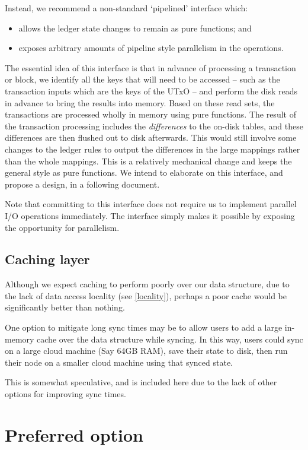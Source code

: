 \documentclass[11pt,a4paper]{article}
\begin{document}
Instead, we recommend a non-standard `pipelined' interface which:
\begin{itemize}
\item allows the ledger state changes to remain as pure functions; and
\item exposes arbitrary amounts of pipeline style parallelism in the operations.
\end{itemize}
The essential idea of this interface is that in advance of processing a
transaction or block, we identify all the keys that will need to be accessed --
such as the transaction inputs which are the keys of the UTxO -- and perform
the disk reads in advance to bring the results into memory. Based on these
read sets, the transactions are processed wholly in memory using pure functions.
The result of the transaction processing includes the \emph{differences} to the
on-disk tables, and these differences are then flushed out to disk afterwards.
This would still involve some changes to the ledger rules to output the
differences in the large mappings rather than the whole mappings. This is a
relatively mechanical change and keeps the general style as pure functions.
We intend to elaborate on this interface, and propose a design, in a following
document.

Note that committing to this interface does not require us to implement
parallel I/O operations immediately. The interface simply makes it possible by
exposing the opportunity for parallelism.

\subsection{Caching layer}
\label{caching-layer}

Although we expect caching to perform poorly over our data structure, due to
the lack of data access locality (see \cref{locality}), perhaps a poor cache
would be significantly better than nothing.

One option to mitigate long sync times may be to allow users to add a large
in-memory cache over the data structure while syncing. In this way, users could
sync on a large cloud machine (Say 64GB RAM), save their state to disk, then run
their node on a smaller cloud machine using that synced state.

This is somewhat speculative, and is included here due to the lack of other
options for improving sync times.

\section{Preferred option}
\label{preferred}
\end{document}
